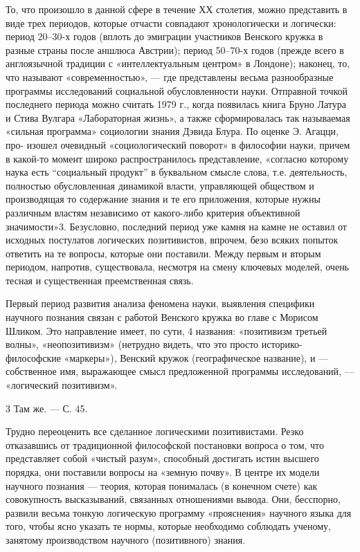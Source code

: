\documentclass[11pt,a4paper]{article}
\begin{document}
То, что произошло в данной сфере в течение ХХ столетия, можно представить в
виде трех периодов, которые отчасти совпадают хронологически и логически:
период 20–30-х годов (вплоть до эмиграции участников Венского кружка в разные
страны после аншлюса Австрии); период 50–70-х годов (прежде всего в
англоязычной традиции с «интеллектуальным центром» в Лондоне); наконец, то,
что называют «современностью», — где представлены весьма разнообразные
программы исследований социальной обусловленности науки. Отправной точкой
последнего периода можно считать 1979 г., когда появилась книга Бруно Латура и
Стива Вулгара «Лабораторная жизнь», а также сформировалась так называемая
«сильная программа» социологии знания Дэвида Блура. По оценке Э. Агацци, про-
изошел очевидный «социологический поворот» в философии науки, причем в
какой-то момент широко распространилось представление, «согласно которому
наука есть “социальный продукт” в буквальном смысле слова, т.е. деятельность,
полностью обусловленная динамикой власти, управляющей обществом и
производящая то содержание знания и те его приложения, которые нужны
различным властям независимо от какого-либо критерия объективной
значимости»3. Безусловно, последний период уже камня на камне не оставил от
исходных постулатов логических позитивистов, впрочем, безо всяких попыток
ответить на те вопросы, которые они поставили. Между первым и вторым периодом,
напротив, существовала, несмотря на смену ключевых моделей, очень тесная и
существенная преемственная связь.

Первый период развития анализа феномена науки, выявления специфики научного
познания связан с работой Венского кружка во главе с Морисом Шликом. Это
направление имеет, по сути, 4 названия: «позитивизм третьей волны»,
«неопозитивизм» (нетрудно видеть, что это просто историко-философские
«маркеры»), Венский кружок (географическое название), и — собственное имя,
выражающее смысл предложенной программы исследований, — «логический
позитивизм».

3 Там же. — С. 45.

Трудно переоценить все сделанное логическими позитивистами. Резко
отказавшись от традиционной философской постановки вопроса о том, что
представляет собой «чистый разум», способный достигать истин высшего
порядка, они поставили вопросы на «земную почву». В центре их модели
научного познания — теория, которая понималась (в конечном счете) как
совокупность высказываний, связанных отношениями вывода.  Они, бесспорно,
развили весьма тонкую логическую программу «прояснения» научного языка для
того, чтобы ясно указать те нормы, которые необходимо соблюдать ученому,
занятому производством научного (позитивного) знания.
\end{document}
